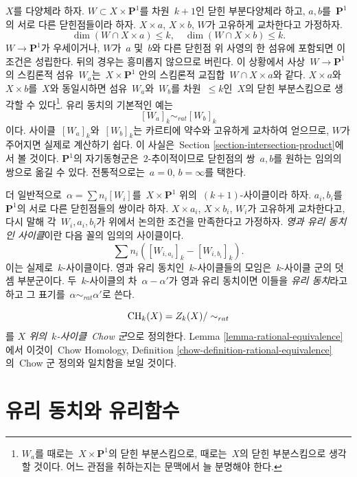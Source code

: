 \medskip\noindent
$X$를 다양체라 하자. $W \subset X \times \mathbf{P}^1$를 차원\ 
$k + 1$인 닫힌 부분다양체라 하고, $a, b$를\  $\mathbf{P}^1$의 서로 다른
닫힌점들이라 하자. $X \times a$, $X \times b$, $W$가 고유하게 교차한다고
가정하자.
$$
\dim (W \cap X \times a) \leq k,\quad
\dim (W \cap X \times b) \leq k.
$$
$W \to \mathbf{P}^1$가 우세이거나, $W$가\  $a$ 및\  $b$와 다른 닫힌점 위
사영의 한 섬유에 포함되면 이 조건은 성립한다. 뒤의 경우는 흥미롭지
않으므로 버린다. 이 상황에서 사상\  $W \to \mathbf{P}^1$의 스킴론적 섬유\ 
$W_a$는\  $X \times \mathbf{P}^1$ 안의 스킴론적 교집합\ 
$W \cap X \times a$와 같다. $X \times a$와\  $X \times b$를\  $X$와
동일시하면 섬유\  $W_a$와\  $W_b$를 차원\  $\leq k$인\  $X$의 닫힌
부분스킴으로 생각할 수 있다\footnote{$W_a$를 때로는\ 
$X \times \mathbf{P}^1$의 닫힌 부분스킴으로, 때로는\  $X$의 닫힌
부분스킴으로 생각할 것이다. 어느 관점을 취하는지는 문맥에서 늘 분명해야
한다.}. 유리 동치의 기본적인 예는
$$
[W_a]_k \sim_{rat} [W_b]_k
$$
이다. 사이클\  $[W_a]_k$와\  $[W_b]_k$는 카르티에 약수와 고유하게 교차하여
얻으므로, $W$가 주어지면 실제로 계산하기 쉽다. 이 사실은\ 
Section \ref{section-intersection-product}에서 볼 것이다.
$\mathbf{P}^1$의 자기동형군은\  $2$-추이적이므로 닫힌점의 쌍\  $a, b$를
원하는 임의의 쌍으로 옮길 수 있다. 전통적으로는\ 
$a = 0$, $b = \infty$를 택한다.

\medskip\noindent
더 일반적으로\  $\alpha = \sum n_i [W_i]$를\ 
$X \times \mathbf{P}^1$ 위의\  $(k + 1)$-사이클이라 하자.
$a_i, b_i$를\  $\mathbf{P}^1$의 서로 다른 닫힌점들의 쌍이라 하자.
$X \times a_i$, $X \times b_i$, $W_i$가 고유하게 교차한다고,
다시 말해 각\  $W_i, a_i, b_i$가 위에서 논의한 조건을 만족한다고
가정하자. {\it 영과 유리 동치인 사이클}이란 다음 꼴의 임의의 사이클이다.
$$
\sum n_i([W_{i, a_i}]_k - [W_{i, b_i}]_k).
$$
이는 실제로\  $k$-사이클이다. 영과 유리 동치인\  $k$-사이클들의 모임은\ 
$k$-사이클 군의 덧셈 부분군이다. 두\  $k$-사이클의 차\ 
$\alpha - \alpha'$가 영과 유리 동치이면 이들을 {\it 유리 동치}라고 하고
그 표기를\  $\alpha \sim_{rat} \alpha'$로 쓴다.

\medskip\noindent
$$
\mathop{\mathrm{CH}}\nolimits_k(X) = Z_k(X)/ \sim_{rat}
$$
를 {\it $X$ 위의\  $k$-사이클\  Chow 군}으로 정의한다.
Lemma \ref{lemma-rational-equivalence}에서 이것이\ 
Chow Homology, Definition \ref{chow-definition-rational-equivalence}의\ 
Chow 군 정의와 일치함을 보일 것이다.


\section{유리 동치와 유리함수}
\label{section-alternative}

